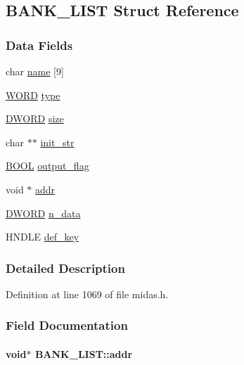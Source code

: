 \subsection{BANK\_\-LIST Struct Reference}
\label{structBANK__LIST}
\subsubsection*{Data Fields}
\begin{DoxyCompactItemize}
\item 
char \hyperlink{structBANK__LIST_a108f74b9ebdca9718cfd91de54899325}{name} \mbox{[}9\mbox{]}
\item 
\hyperlink{vt2_8h_a2b0e863dadf920709ec53d9088ee7c91}{WORD} \hyperlink{structBANK__LIST_a949d7a28bdf3923796ffb2dff8f28690}{type}
\item 
\hyperlink{vt2_8h_a798af1e30bc65f319c1a246cecf59e39}{DWORD} \hyperlink{structBANK__LIST_a4208294c0d0b8b4df63102ff7d4eb887}{size}
\item 
char $\ast$$\ast$ \hyperlink{structBANK__LIST_a7ebd92f00cb428fcbb555f3ad30b86c8}{init\_\-str}
\item 
\hyperlink{vt2_8h_a239c7f0d40651c3e419c5b9651507d14}{BOOL} \hyperlink{structBANK__LIST_ae2fa2419da6dc57ec48d57da2b18b58a}{output\_\-flag}
\item 
void $\ast$ \hyperlink{structBANK__LIST_a1c924a02fd91149314d805f025d52d40}{addr}
\item 
\hyperlink{vt2_8h_a798af1e30bc65f319c1a246cecf59e39}{DWORD} \hyperlink{structBANK__LIST_abea5afb1cbece5741ede80d53469368e}{n\_\-data}
\item 
HNDLE \hyperlink{structBANK__LIST_a732747585d79c8c76c856d376aa56cf0}{def\_\-key}
\end{DoxyCompactItemize}


\subsubsection{Detailed Description}


Definition at line 1069 of file midas.h.

\subsubsection{Field Documentation}
\paragraph[{addr}]{\setlength{\rightskip}{0pt plus 5cm}void$\ast$ {\bf BANK\_\-LIST::addr}}\hfill\label{structBANK__LIST_a1c924a02fd91149314d805f025d52d40}

